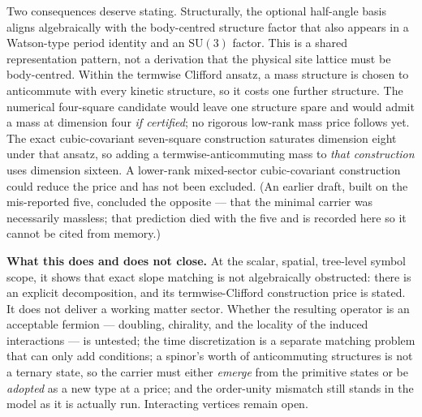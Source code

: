 \documentclass[11pt,a4paper]{article}
\theoremstyle{definition}
\theoremstyle{plain}
\theoremstyle{remark}
\begin{document}
Two consequences deserve stating. Structurally, the optional half-angle
basis aligns algebraically with the body-centred structure factor that also
appears in a Watson-type period identity and an $\mathrm{SU}(3)$ factor.
This is a shared representation pattern, not a derivation that the physical
site lattice must be body-centred. Within the termwise Clifford ansatz, a
mass structure is chosen to anticommute with every kinetic structure, so it costs one
further structure. The numerical four-square candidate would leave one
structure spare and would admit a mass at dimension four \emph{if
certified}; no rigorous low-rank mass price follows yet. The exact
cubic-covariant seven-square construction saturates dimension eight under
that ansatz, so adding a termwise-anticommuting mass to \emph{that
construction} uses dimension sixteen.
A lower-rank mixed-sector cubic-covariant construction could reduce the price and
has not been excluded. (An earlier draft, built on the
mis-reported five, concluded the opposite --- that the minimal carrier was
necessarily massless; that prediction died with the five and is recorded
here so it cannot be cited from memory.)

\begin{scopebox}
\textbf{What this does and does not close.} At the scalar, spatial,
tree-level symbol scope, it shows that exact slope matching is not
algebraically obstructed: there is an explicit decomposition, and its
termwise-Clifford construction price is stated.
It does not deliver a working matter sector. Whether the resulting operator
is an acceptable fermion --- doubling, chirality, and the locality of the
induced interactions --- is untested; the time discretization is a separate
matching problem that can only add conditions; a spinor's worth of
anticommuting structures is not a ternary state, so the carrier must
either \emph{emerge} from the primitive states or be \emph{adopted} as a
new type at a price; and the
order-unity mismatch still stands in the model as it is actually run.
Interacting vertices remain open.
\end{scopebox}
\end{document}
